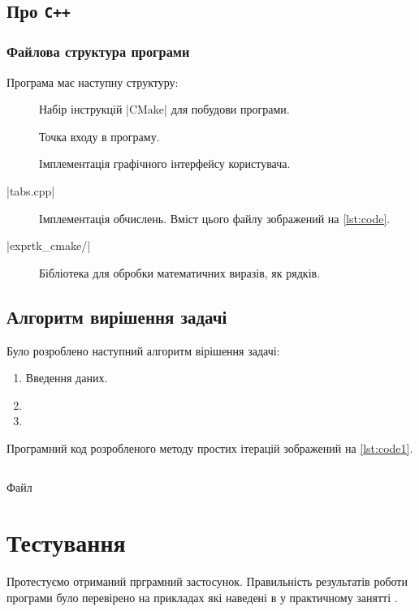 \documentclass[../../../../document]{subfiles}
\begin{document}
	\section{Про \texttt{C++}}
	\subsection{Файлова структура програми}
	Програма має наступну структуру:
	\begin{description}
		\item[]
			Набір інструкцій \textinline|CMake| для побудови програми. 
		\item[]
			Точка входу в програму. 
		\item[]
			Імплементація графічного інтерфейсу користувача. 
		\item[\textinline|tabs.cpp|]
			Імплементація обчислень. Вміст цього файлу зображений на \cref{lst:code}.
		\item[\textinline|exprtk_cmake/|] Бібліотека для обробки математичних виразів, як рядків.
	\end{description}

	\section{Алгоритм вирішення задачі}
	Було розроблено наступний алгоритм вірішення задачі:
	\begin{enumerate}
		\item Введення даних. 
		\item
		\item
	\end{enumerate}	

	Програмний код розробленого методу простих ітерацій зображений на \cref{lst:code1}.
	\begin{longlisting}
		 \begin{Center}
			 \inputminted{cpp}{\subfix{../../../../../include/iter.cpp}}
		 \end{Center}
		 \caption{Файл }\label{lst:code1}
	\end{longlisting}

	\FloatBarrier
	\chapter{Тестування}
	Протестуємо отриманий прграмний застосунок. 
	Правильність результатів роботи програми було перевірено на прикладах які наведені в \cite{computational_methods} у практичному занятті \prodnumber{}.
\end{document}
